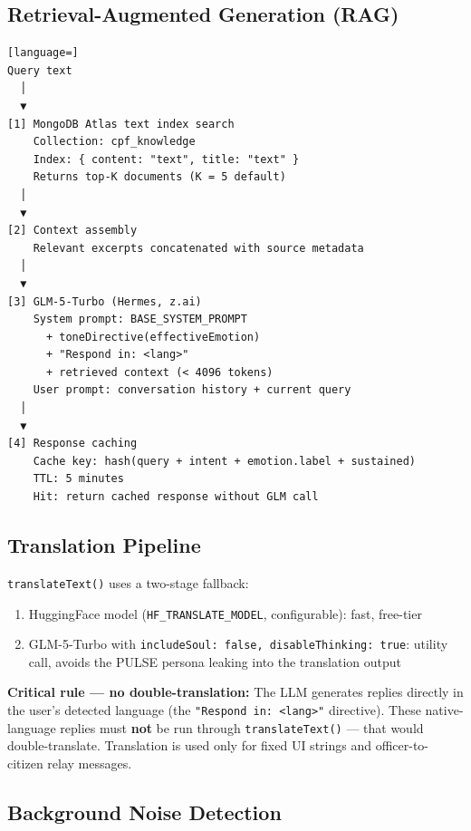 \documentclass[12pt,a4paper]{article}
\begin{document}
\subsection{Retrieval-Augmented Generation (RAG)}

\begin{lstlisting}[language=]
Query text
  │
  ▼
[1] MongoDB Atlas text index search
    Collection: cpf_knowledge
    Index: { content: "text", title: "text" }
    Returns top-K documents (K = 5 default)
  │
  ▼
[2] Context assembly
    Relevant excerpts concatenated with source metadata
  │
  ▼
[3] GLM-5-Turbo (Hermes, z.ai)
    System prompt: BASE_SYSTEM_PROMPT
      + toneDirective(effectiveEmotion)
      + "Respond in: <lang>"
      + retrieved context (< 4096 tokens)
    User prompt: conversation history + current query
  │
  ▼
[4] Response caching
    Cache key: hash(query + intent + emotion.label + sustained)
    TTL: 5 minutes
    Hit: return cached response without GLM call
\end{lstlisting}

\subsection{Translation Pipeline}

\texttt{translateText()} uses a two-stage fallback:

\begin{enumerate}[noitemsep]
  \item HuggingFace model (\texttt{HF\_TRANSLATE\_MODEL}, configurable): fast, free-tier
  \item GLM-5-Turbo with \texttt{includeSoul: false, disableThinking: true}: utility call,
        avoids the PULSE persona leaking into the translation output
\end{enumerate}

\begin{callout}
\textbf{Critical rule — no double-translation:} The LLM generates replies directly
in the user's detected language (the \texttt{"Respond in: <lang>"} directive). These
native-language replies must \textbf{not} be run through \texttt{translateText()} — that
would double-translate. Translation is used only for fixed UI strings and
officer-to-citizen relay messages.
\end{callout}

\subsection{Background Noise Detection}
\end{document}

